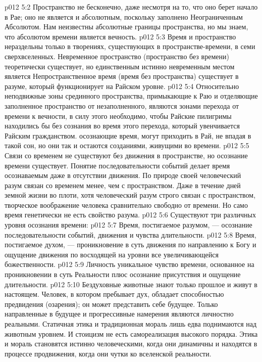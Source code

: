 \vs p012 5:2 Пространство не бесконечно, даже несмотря на то, что оно берет начало в Рае; оно не является и абсолютным, поскольку заполнено Неограниченным Абсолютом. Нам неизвестны абсолютные границы пространства, но мы знаем, что абсолютом времени является вечность.
\vs p012 5:3 \pc Время и пространство нераздельны только в творениях, существующих в пространстве\hyp{}времени, в семи сверхвселенных. Невременное пространство (пространство без времени) теоретически существует, но единственным истинно невременным местом является  Непространственное время (время без пространства) существует в разуме, который функционирует на Райском уровне.
\vs p012 5:4 Относительно неподвижные зоны срединного пространства, примыкающие к Раю и отделяющие заполненное пространство от незаполненного, являются зонами перехода от времени к вечности, в силу этого необходимо, чтобы Райские пилигримы находились бы без сознания во время этого перехода, который увенчивается Райским гражданством.  осознающие время, могут приходить в Рай, не впадая в такой сон, но они так и остаются созданиями, живущими во времени.
\vs p012 5:5 \pc Связи со временем не существуют без движения в пространстве, но осознание времени существует. Понятие последовательности событий делает время осознаваемым даже в отсутствии движения. По природе своей человеческий разум связан со временем менее, чем с пространством. Даже в течение дней земной жизни во плоти, хотя человеческий разум строго связан с пространством, творческое воображение человека сравнительно свободно от времени. Но само время генетически не есть свойство разума.
\vs p012 5:6 \pc Существуют три различных уровня осознания времени:
\vs p012 5:7 \bibnobreakspace Время, постигаемое разумом, --- осознание последовательности событий, движения и чувства длительности.
\vs p012 5:8 \bibnobreakspace Время, постигаемое духом, --- проникновение в суть движения по направлению к Богу и ощущение движения по восходящей на уровни все увеличивающейся божественности.
\vs p012 5:9 \bibnobreakspace Личность  уникальное чувство времени, основанное на проникновении в суть Реальности плюс осознание присутствия и ощущение длительности.
\vs p012 5:10 \pc Бездуховные животные знают только прошлое и живут в настоящем. Человек, в котором пребывает дух, обладает способностью предвидения (озарения); он может представить себе будущее. Только направленные в будущее и прогрессивные намерения являются личностно реальными. Статичная этика и традиционная мораль лишь едва поднимаются над животным уровнем. И стоицизм не есть самореализация высокого порядка. Этика и мораль становятся истинно человеческими, когда они динамичны и находятся в процессе продвижения, когда они чутки ко вселенской реальности.
